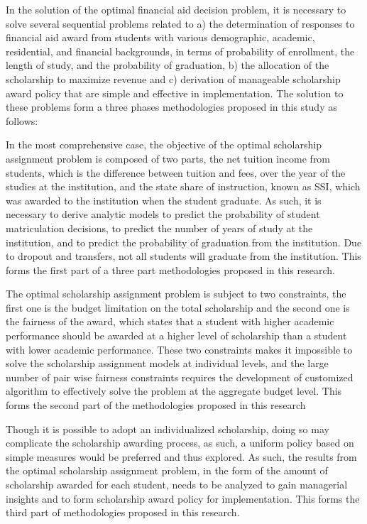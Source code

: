 \documentclass[12pt,english]{report}
\begin{document}
In the solution of the optimal financial aid decision problem,  it is necessary
to solve several sequential problems related to a) the determination of
responses to financial aid award from students with various demographic,
academic, residential, and financial backgrounds, in terms of probability of
enrollment, the length of study, and the probability of graduation, b) the
allocation of the scholarship to maximize revenue and c) derivation of
manageable scholarship award policy that are simple and effective in
implementation.  The solution to these problems form a three phases
methodologies proposed in this study as follows:


In the most comprehensive case, the objective of the optimal scholarship
assignment problem is composed of two parts, the net tuition income from
students, which is the difference between tuition and fees, over the year of
the
studies at the institution, and the state share of instruction, known as SSI,
which was awarded to the institution when the student graduate.  As such,  it
is necessary to derive analytic models to predict the probability of student
matriculation decisions, to predict the number of years of study at the
institution, and to predict the probability of graduation from the institution.
Due to dropout and transfers, not all students will graduate from the
institution.  This forms the first part of a three part methodologies proposed
in this research.

The optimal scholarship assignment problem is subject to two constraints, the
first one is the budget limitation on the total scholarship and the second one
is the fairness of the award, which states that  a student with higher
academic performance should be awarded at a higher level of scholarship than
a student with lower academic performance.  These two constraints makes it
impossible to solve the scholarship assignment models at individual levels, and
the large number of pair wise fairness constraints requires the development of
customized algorithm to effectively solve the problem at the aggregate budget
level.  This forms the second part of the methodologies proposed in this
research

Though it is possible to adopt an individualized scholarship, doing so may
complicate the scholarship awarding process, as such, a uniform policy based on
simple measures would be preferred and thus explored.  As such, the results
from the optimal scholarship assignment problem, in the form of the  amount of
scholarship awarded for each student, needs to be analyzed to gain managerial
insights and to form scholarship award policy for implementation.  This forms
the third part of methodologies proposed in this research.
\end{document}
